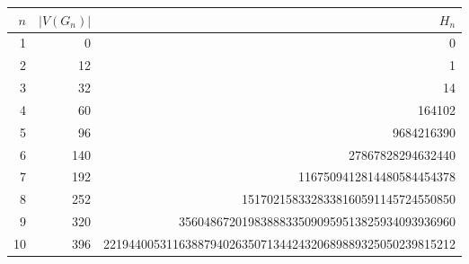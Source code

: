 \begin{tabular}{rrr}
\toprule
$n$ & $|V(G_n)|$ & $H_n$ \\
\midrule
1 & 0 & 0 \\
2 & 12 & 1 \\
3 & 32 & 14 \\
4 & 60 & 164102 \\
5 & 96 & 9684216390 \\
6 & 140 & 27867828294632440 \\
7 & 192 & 1167509412814480584454378 \\
8 & 252 & 1517021583328338160591145724550850 \\
9 & 320 & 35604867201983888335090959513825934093936960 \\
10 & 396 & 22194400531163887940263507134424320689889325050239815212 \\
\bottomrule
\end{tabular}
